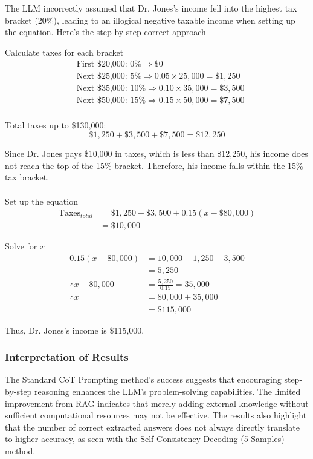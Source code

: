 \documentclass[11pt,a4paper]{article}
\begin{document}
\begin{tcolorbox}[colback=gray!10, colframe=black, title=\textbf{Step-by-Step Analysis}, fonttitle=\bfseries]
\footnotesize
The LLM incorrectly assumed that Dr. Jones's income fell into the highest tax bracket (20\%), leading to an illogical negative taxable income when setting up the equation. Here's the step-by-step correct approach

Calculate taxes for each bracket
\[
\begin{aligned}
&\text{First \$20,000: } 0\% \Rightarrow \$0 \\
&\text{Next \$25,000: } 5\% \Rightarrow 0.05 \times 25,000 = \$1,250 \\
&\text{Next \$35,000: } 10\% \Rightarrow 0.10 \times 35,000 = \$3,500 \\
&\text{Next \$50,000: } 15\% \Rightarrow 0.15 \times 50,000 = \$7,500 \\
\end{aligned}
\]
   
Total taxes up to \$130,000:
\[
\$1,250 + \$3,500 + \$7,500 = \$12,250
\]

Since Dr. Jones pays \$10,000 in taxes, which is less than \$12,250, his income does not reach the top of the 15\% bracket. Therefore, his income falls within the 15\% tax bracket.
\\
\\
Set up the equation
\begin{align*}
\text{Taxes}_{total} &= \$1,250 + \$3,500 + 0.15(x - \$80,000) \\
&= \$10,000
\end{align*}

Solve for \( x \)
\begin{align*}
0.15(x - 80,000) &= 10,000 - 1,250 - 3,500 \\
&= 5,250 \\
\therefore x - 80,000 &= \frac{5,250}{0.15} = 35,000 \\
\therefore x &= 80,000 + 35,000 \\ &= \$115,000
\end{align*}

Thus, Dr. Jones's income is \$115,000.
\end{tcolorbox}

\subsubsection{Interpretation of Results}
The Standard CoT Prompting method's success suggests that encouraging step-by-step reasoning enhances the LLM's problem-solving capabilities. The limited improvement from RAG indicates that merely adding external knowledge without sufficient computational resources may not be effective. The results also highlight that the number of correct extracted answers does not always directly translate to higher accuracy, as seen with the Self-Consistency Decoding (5 Samples) method.
\end{document}
